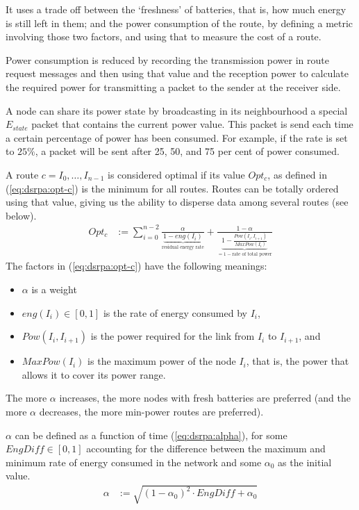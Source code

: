 It uses a trade off between the `freshness' of batteries, that is, how much
energy is still left in them; and the power consumption of the route, by
defining a metric involving those two factors, and using that to measure the
cost of a route.

Power consumption is reduced by recording the transmission power in route
request messages and then using that value and the reception power to calculate
the required power for transmitting a packet to the sender at the receiver side.

A node can share its power state by broadcasting in its neighbourhood a special
$E_{state}$ packet that contains the current power value. This packet is send
each time a certain percentage of power has been consumed. For example, if the
rate is set to $25\%$, a packet will be sent after 25, 50, and 75 per cent of
power consumed.

A route $c=I_{0}, \ldots, I_{n-1}$ is considered optimal if its value $Opt_{c}$,
as defined in  (\ref{eq:dsrpa:opt-c}) is the minimum for all routes. Routes can
be totally ordered using that value, giving us the ability to disperse data
among several routes (see below).
\begin{align}
Opt_{c} &:= \sum_{i=0}^{n-2} \frac{\alpha}{\underbrace{1-eng(I_{i})}_{\text{residual energy rate}}} + \frac{1-\alpha}{\underbrace{1-\frac{Pow(I_{i}, I_{i+1})}{MaxPow(I_{i})}}_{= 1 - \text{rate of total power}}}
\label{eq:dsrpa:opt-c}
\end{align} 
The factors in  (\ref{eq:dsrpa:opt-c}) have the following meanings:
\begin{itemize}
    \item $\alpha$ is a weight
    \item $eng(I_{i}) \in [0,1]$ is the rate of energy consumed by $I_{i}$,
    \item $Pow(I_{i}, I_{i+1})$ is the power required for the link from $I_{i}$ to $I_{i+1}$, and
    \item $MaxPow(I_{i})$ is the maximum power of the node $I_{i}$, that is, the power that allows
          it to cover its power range.
\end{itemize}


The more $\alpha$ increases, the more nodes with fresh batteries are preferred
(and the more $\alpha$ decreases, the more min-power routes are preferred).

$\alpha$ can be defined as a function of time (\ref{eq:dsrpa:alpha}),
for some $EngDiff \in [0,1]$ accounting for the difference between the maximum and minimum rate
of energy consumed in the network and some $\alpha_{0}$ as the initial value.
\begin{align}
    \alpha &:= \sqrt{(1-\alpha_{0})^{2} \cdot EngDiff + \alpha_{0}}
    \label{eq:dsrpa:alpha}
\end{align}

